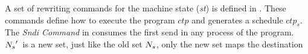 A set of rewriting commands for the machine state (\textit{st}) is defined in . These commands define how to execute the program $\mathit{ctp}$ and generates a schedule $\mathit{ctp}_s$. The \emph{Sndi Command} in  consumes the first send in any process of the program. 
$\textit{$N_s$}^\prime$\ is a new set, just like the old set $\textit{$N_s$}$, only the new set maps the destination
